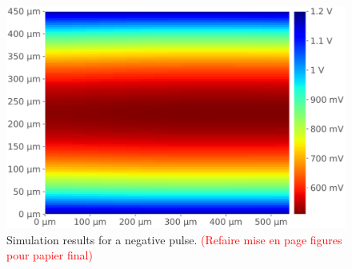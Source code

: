 \begin{figure}[hbtp]
\begin{minipage}{0.3\textwidth}
		\includegraphics[width=\textwidth]{./figures/modelesSimusResul/dualWell/positive/pdn_dw_positif300.pdf}
	\end{minipage}


	\caption{Simulation results for a negative pulse. \textcolor{red}{(Refaire mise en page figures pour papier final)}}
	\label{sim_res}
\end{figure}
